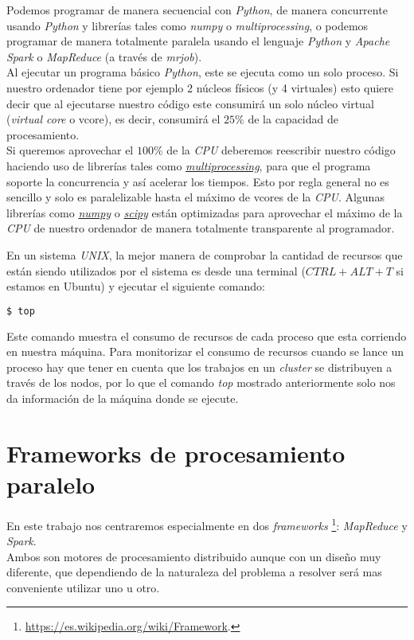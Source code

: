 Podemos programar de manera secuencial con \textit{Python}, de manera concurrente usando \textit{Python} y 
librerías tales como \textit{numpy} o \textit{multiprocessing}, o podemos programar de manera totalmente paralela
usando el lenguaje \textit{Python} y \textit{Apache Spark} o \textit{MapReduce} (a través de \textit{mrjob}).\\
Al ejecutar un programa básico \textit{Python}, este se ejecuta como un solo proceso. Si nuestro ordenador tiene 
por ejemplo 2 núcleos físicos (y 4 virtuales) esto quiere decir que al ejecutarse nuestro código 
este consumirá un solo núcleo virtual (\textit{virtual core} o vcore),
es decir, consumirá el $25\%$ de la capacidad de procesamiento.\\
Si queremos aprovechar el $100\% $ de la \textit{CPU} deberemos reescribir nuestro código haciendo uso de librerías 
tales como \href{https://docs.python.org/2/library/multiprocessing.html}{\textit{multiprocessing}}, 
para que el programa soporte la concurrencia y así acelerar los tiempos.
Esto por regla general no es sencillo y solo es paralelizable hasta el máximo de vcores de la \textit{CPU}. 
Algunas librerías como \href{http://www.numpy.org/}{\textit{numpy}} o 
\href{https://www.scipy.org/}{\textit{scipy}} están optimizadas para aprovechar el máximo 
de la \textit{CPU} de nuestro ordenador de manera totalmente transparente al programador.
\newline

En un sistema \textit{UNIX}, la mejor manera de comprobar la cantidad de recursos que están siendo utilizados 
por el sistema es desde una terminal ($CTRL + ALT + T$ si estamos en Ubuntu) y ejecutar el siguiente comando:

\begin{lstlisting}[language=bash, numbers=none]
$ top
\end{lstlisting}

Este comando muestra el consumo de recursos de cada proceso que esta corriendo en nuestra máquina.
Para monitorizar el consumo de recursos cuando se lance un proceso hay que tener en cuenta que los trabajos en 
un \textit{cluster} se distribuyen a través de los nodos, por lo que el comando \textit{top} mostrado anteriormente 
solo nos da información de la máquina donde se ejecute.

\clearpage

\section[Frameworks]{Frameworks de procesamiento paralelo}\label{sec:frameworks_procesamiento_paralelo}
En este trabajo nos centraremos especialmente en dos \textit{frameworks}
\footnote{\url{https://es.wikipedia.org/wiki/Framework}.}: \textit{MapReduce} y \textit{Spark}. \\
Ambos son motores de procesamiento distribuido aunque con un diseño muy diferente, que dependiendo 
de la naturaleza del problema a resolver será mas conveniente utilizar uno u otro.

